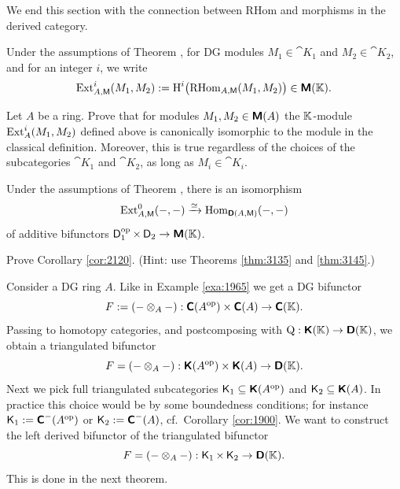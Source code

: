 We end this section with the connection between RHom and morphisms in the 
derived category. 

\begin{dfn} \label{dfn:2121}
Under the assumptions of Theorem \tup{\ref{thm:2005}},  
for DG modules $M_1 \in \cat{K}_1$ and $M_2 \in \cat{K}_2$,
and for an integer $i$, we write%
\[ \operatorname{Ext}^i_{A, \operatorname{\mathsf{M}}}(M_1, M_2) := 
\operatorname{H}^i \bigl( \operatorname{RHom}_{A, \operatorname{\mathsf{M}}}(M_1, M_2) \bigr) \in \boldsymbol{\mathsf{M}}(\mathbb{K}) . \]
\end{dfn}

\begin{exer} \label{exer:2125}
Let $A$ be a ring. Prove that for modules 
$M_1, M_2 \in \boldsymbol{\mathsf{M}}(A)$ the $\mathbb{K}$-module
$\operatorname{Ext}^i_{A}(M_1, M_2)$ defined above is canonically isomorphic to the 
module in the classical definition. Moreover, this is true regardless of the 
choices of the subcategories $\cat{K}_1 $ and $\cat{K}_2$,
as long as $M_i \in \cat{K}_i$. 
\end{exer}

\begin{cor} \label{cor:2120}
Under the assumptions of Theorem \tup{\ref{thm:2005}}, there is an  
isomorphism 
\[  \operatorname{Ext}^0_{A, \operatorname{\mathsf{M}}}(-, -) \xrightarrow{\simeq} 
\operatorname{Hom}_{\boldsymbol{\mathsf{D}}(A, \operatorname{\mathsf{M}})}(-, -) \]
of additive bifunctors 
$\operatorname{\mathsf{D}}_1^{\mathrm{op}} \times \operatorname{\mathsf{D}}_2 \to \boldsymbol{\mathsf{M}}(\mathbb{K})$.
\end{cor}

\begin{exer} \label{exer:2140}
Prove Corollary \ref{cor:2120}. (Hint: use Theorems \ref{thm:3135} and 
\ref{thm:3145}.)
\end{exer}




\label{subsec:LTors}

Consider a DG ring $A$. Like in Example \ref{exa:1965} we get a DG bifunctor 
\[ F := (- \otimes_A -) : \boldsymbol{\mathsf{C}}(A^{\mathrm{op}}) \times \boldsymbol{\mathsf{C}}(A) 
\to \boldsymbol{\mathsf{C}}(\mathbb{K}) . \]
Passing to homotopy categories, and postcomposing with 
$\operatorname{Q} : \boldsymbol{\mathsf{K}}(\mathbb{K}) \to \boldsymbol{\mathsf{D}}(\mathbb{K})$, 
we obtain a triangulated bifunctor 
\[ F = (- \otimes_A -) : \boldsymbol{\mathsf{K}}(A^{\mathrm{op}}) \times
\boldsymbol{\mathsf{K}}(A) \to \boldsymbol{\mathsf{D}}(\mathbb{K}) . \]
Next we pick full triangulated subcategories 
$\operatorname{\mathsf{K}}_1 \subseteq \boldsymbol{\mathsf{K}}(A^{\mathrm{op}})$
and
$\operatorname{\mathsf{K}}_2 \subseteq \boldsymbol{\mathsf{K}}(A)$. 
In practice this choice would be by some boundedness conditions; for instance
$\operatorname{\mathsf{K}}_1 := \boldsymbol{\mathsf{C}}^{-}(A^{\mathrm{op}})$
or $\operatorname{\mathsf{K}}_2 := \boldsymbol{\mathsf{C}}^{-}(A)$, cf.\ Corollary \ref{cor:1900}.
We want to construct the left derived 
bifunctor of the triangulated bifunctor 
\[ F = (- \otimes_A -) : \operatorname{\mathsf{K}}_1 \times
\operatorname{\mathsf{K}}_2 \to \boldsymbol{\mathsf{D}}(\mathbb{K}) . \]
This is done in the next theorem. 

